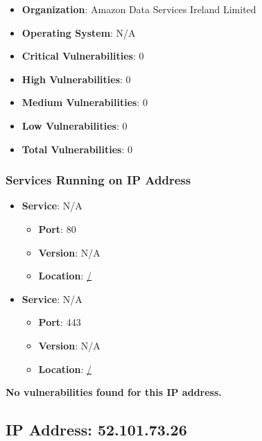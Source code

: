 \documentclass{article}
\begin{document}
\begin{itemize}
    \item \textbf{Organization}: Amazon Data Services Ireland Limited
    \item \textbf{Operating System}:  N/A 
    \item \textbf{Critical Vulnerabilities}: 0
    \item \textbf{High Vulnerabilities}: 0
    \item \textbf{Medium Vulnerabilities}: 0
    \item \textbf{Low Vulnerabilities}: 0
    \item \textbf{Total Vulnerabilities}: 0
\end{itemize}

\subsubsection*{Services Running on IP Address}

\begin{itemize}
    
        \item \textbf{Service}: N/A
        \begin{itemize}
            \item \textbf{Port}: 80
            \item \textbf{Version}:  N/A 
            \item \textbf{Location}: \href{ / }{ / }
        \end{itemize}
    
        \item \textbf{Service}: N/A
        \begin{itemize}
            \item \textbf{Port}: 443
            \item \textbf{Version}:  N/A 
            \item \textbf{Location}: \href{ / }{ / }
        \end{itemize}
    
\end{itemize}


\textbf{No vulnerabilities found for this IP address.}




\clearpage



\subsection*{IP Address: 52.101.73.26}
\end{document}
